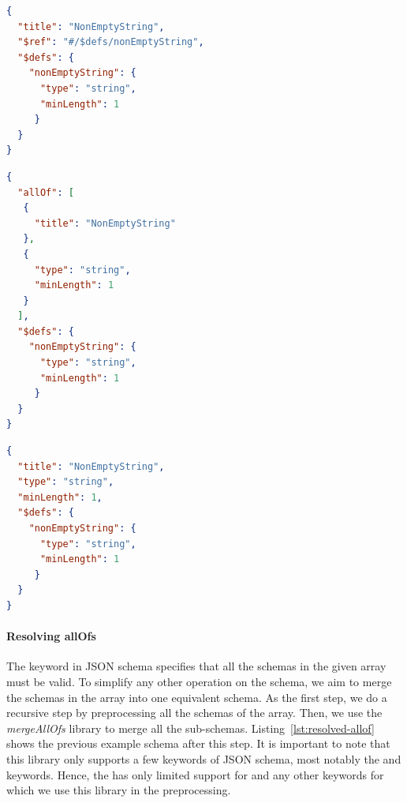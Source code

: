 \begin{lstlisting}[language=json,firstnumber=1,caption=
    {Simple JSON schema before reference resolving},captionpos=b,label={lst:preprocessing-example}]
{
  "title": "NonEmptyString",
  "$ref": "#/$defs/nonEmptyString",
  "$defs": {
    "nonEmptyString": {
      "type": "string",
      "minLength": 1
     }
  }
}
\end{lstlisting}

\begin{lstlisting}[language=json,firstnumber=1,caption=
    {Simple JSON schema after reference resolving},captionpos=b,label={lst:reference-resolving}]
{
  "allOf": [
   {
     "title": "NonEmptyString"
   },
   {
     "type": "string",
     "minLength": 1
   }
  ],
  "$defs": {
    "nonEmptyString": {
      "type": "string",
      "minLength": 1
     }
  }
}
\end{lstlisting}

\begin{lstlisting}[language=json, firstnumber=1, caption=
    {Simple JSON schema after allOf resolving}, captionpos=b,label={lst:resolved-allof}]
{
  "title": "NonEmptyString",
  "type": "string",
  "minLength": 1,
  "$defs": {
    "nonEmptyString": {
      "type": "string",
      "minLength": 1
     }
  }
}
\end{lstlisting}

\paragraph{Resolving allOfs}

The  keyword in JSON schema specifies that all the schemas in the given array must be valid.
To simplify any other operation on the schema, we aim to merge the schemas in the  array into one equivalent schema.
As the first step, we do a recursive step by preprocessing all the schemas of the  array.
Then, we use the \textit{mergeAllOfs}\cite{githubGitHubMokkabonnajsonschemamergeallof} library to merge all the sub-schemas.
Listing~\ref{lst:resolved-allof} shows the previous example schema after this step.
It is important to note that this library only supports a few keywords of JSON schema, most notably the
 and  keywords.
Hence, the \toolname{} has only limited support for  and any other keywords for which we use this library in the preprocessing.

